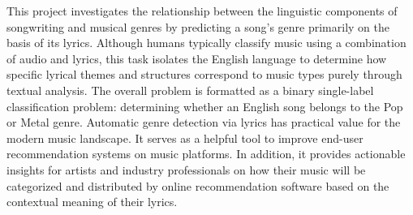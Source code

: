 This project investigates the relationship between the linguistic components of songwriting and musical genres by predicting a song's genre primarily on the basis of its lyrics. Although humans typically classify music using a combination of audio and lyrics, this task isolates the English language to determine how specific lyrical themes and structures correspond to music types purely through textual analysis. The overall problem is formatted as a binary single-label classification problem: determining whether an English song belongs to the Pop or Metal genre. Automatic genre detection via lyrics has practical value for the modern music landscape. It serves as a helpful tool to improve end-user recommendation systems on music platforms. In addition, it provides actionable insights for artists and industry professionals on how their music will be categorized and distributed by online recommendation software based on the contextual meaning of their lyrics.